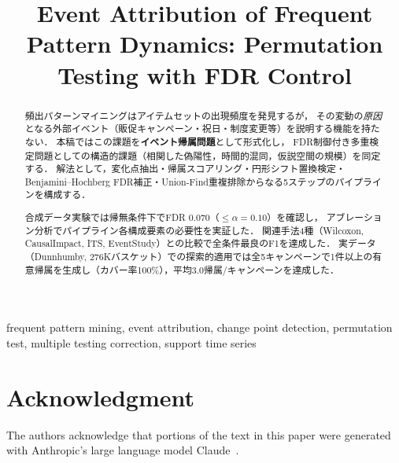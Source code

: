\documentclass[conference]{IEEEtran}
\begin{document}
\title{Event Attribution of Frequent Pattern Dynamics: Permutation Testing with FDR Control}

\author{
  \and
}

\maketitle
\pagestyle{plain}

\begin{abstract}
頻出パターンマイニングはアイテムセットの出現頻度を発見するが，
その変動の\emph{原因}となる外部イベント（販促キャンペーン・祝日・制度変更等）を説明する機能を持たない．
本稿ではこの課題を\textbf{イベント帰属問題}として形式化し，
FDR制御付き多重検定問題としての構造的課題（相関した偽陽性，時間的混同，仮説空間の規模）を同定する．
解法として，変化点抽出・帰属スコアリング・円形シフト置換検定・Benjamini--Hochberg FDR補正・Union-Find重複排除からなる5ステップのパイプラインを構成する．

合成データ実験では帰無条件下でFDR 0.070（$\leq \alpha = 0.10$）を確認し，
アブレーション分析でパイプライン各構成要素の必要性を実証した．
関連手法4種（Wilcoxon, CausalImpact, ITS, EventStudy）との比較で全条件最良のF1を達成した．
実データ（Dunnhumby, 276Kバスケット）での探索的適用では全5キャンペーンで1件以上の有意帰属を生成し（カバー率100\%），平均3.0帰属/キャンペーンを達成した．
\end{abstract}

\begin{IEEEkeywords}
frequent pattern mining, event attribution, change point detection,
permutation test, multiple testing correction, support time series
\end{IEEEkeywords}








\section*{Acknowledgment}
The authors acknowledge that portions of the text in
this paper were generated with Anthropic's large language
model Claude~\cite{claude2025}.

\newpage



\clearpage
\appendices

\end{document}
